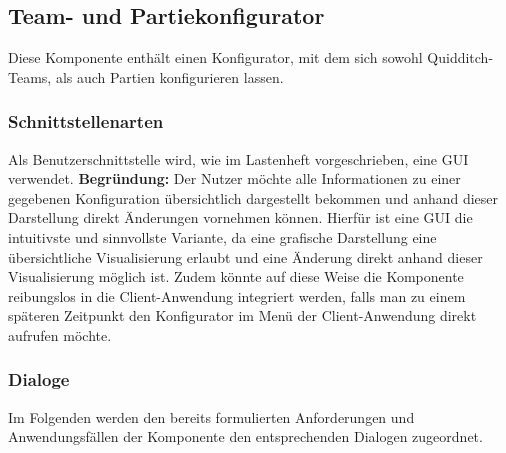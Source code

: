 \subsection{Team- und Partiekonfigurator}
Diese Komponente enthält einen Konfigurator, mit dem sich sowohl Quidditch-Teams, als auch Partien konfigurieren lassen.

\subsubsection{Schnittstellenarten}
Als Benutzerschnittstelle wird, wie im Lastenheft vorgeschrieben, eine GUI verwendet. \textbf{Begründung:} Der Nutzer möchte alle Informationen zu einer gegebenen Konfiguration übersichtlich dargestellt bekommen und anhand dieser Darstellung direkt Änderungen vornehmen können. Hierfür ist eine GUI die intuitivste und sinnvollste Variante, da eine grafische Darstellung eine übersichtliche Visualisierung erlaubt und eine Änderung direkt anhand dieser Visualisierung möglich ist. Zudem könnte auf diese Weise die Komponente reibungslos in die Client-Anwendung integriert werden, falls man zu einem späteren Zeitpunkt den Konfigurator im Menü der Client-Anwendung direkt aufrufen möchte.

\subsubsection{Dialoge}
Im Folgenden werden den bereits formulierten Anforderungen und Anwendungsfällen der Komponente den entsprechenden Dialogen zugeordnet.

